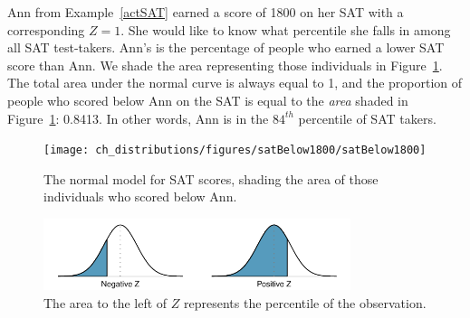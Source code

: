 \begin{examplewrap}
\begin{nexample}{Ann from Example~\ref{actSAT} earned a score of 1800 on her SAT with a corresponding $Z=1$. She would like to know what percentile she falls in among all SAT test-takers.}
Ann's  is the percentage of people who earned a lower SAT score than Ann. We shade the area representing those individuals in Figure~\ref{satBelow1800}. The total area under the normal curve is always equal to 1, and the proportion of people who scored below Ann on the SAT is equal to the \emph{area} shaded in Figure~\ref{satBelow1800}: 0.8413. In other words, Ann is in the $84^{th}$ percentile of SAT takers.
\end{nexample}
\end{examplewrap}

\begin{figure}[htb]
   \centering
   \texttt{[image: ch\_distributions/figures/satBelow1800/satBelow1800]}
   \caption{The normal model for SAT scores, shading the area of those individuals who scored below Ann.}
   \label{satBelow1800}
\end{figure}

\begin{figure}
\centering
\includegraphics[width=0.8\textwidth]{ch_distributions/figures/normalTails/normalTails}
\caption{The area to the left of $Z$ represents the percentile of the observation.}
\label{normalTails}
\end{figure}

